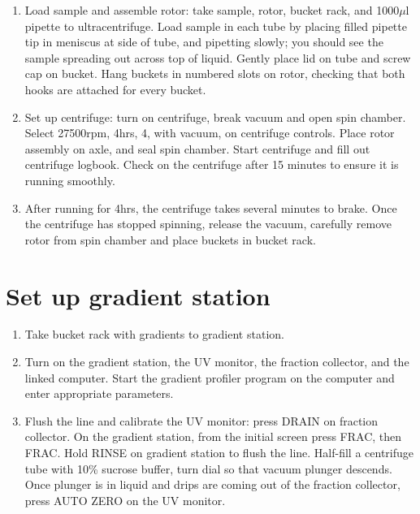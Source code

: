 \documentclass{article}
\newcommand{\mul}{\ensuremath{\mu}l }
\begin{document}
\begin{enumerate}
  \item Load sample and assemble rotor: take sample, rotor, bucket rack, and 1000\mul pipette to ultracentrifuge. Load sample in each tube by placing filled pipette tip in meniscus at side of tube, and pipetting slowly; you should see the sample spreading out across top of liquid. Gently place lid on tube and screw cap on bucket. Hang buckets in numbered slots on rotor, checking that both hooks are attached for every bucket.
  \item Set up centrifuge: turn on centrifuge, break vacuum and open spin chamber. Select 27500rpm, 4hrs, 4\celsius, with vacuum, on centrifuge controls. Place rotor assembly on axle, and seal spin chamber. Start centrifuge and fill out centrifuge logbook. Check on the centrifuge after 15 minutes to ensure it is running smoothly.
  \item After running for 4hrs, the centrifuge takes several minutes to brake. Once the centrifuge has stopped spinning, release the vacuum, carefully remove rotor from spin chamber and place buckets in bucket rack. 
\end{enumerate}


\section{Set up gradient station}

\begin{enumerate}
  \item Take bucket rack with gradients to gradient station. 
  \item Turn on the gradient station, the UV monitor, the fraction collector, and the linked computer. Start the gradient profiler program on the computer and enter appropriate parameters.
  \item Flush the line and calibrate the UV monitor: press DRAIN on fraction collector.  On the gradient station, from the initial screen press FRAC, then FRAC. Hold RINSE on gradient station to flush the line. Half-fill a centrifuge tube with 10\% sucrose buffer, turn dial so that vacuum plunger descends. Once plunger is in liquid and drips are coming out of the fraction collector, press AUTO ZERO on the UV monitor.  %

\end{enumerate}
\end{document}
